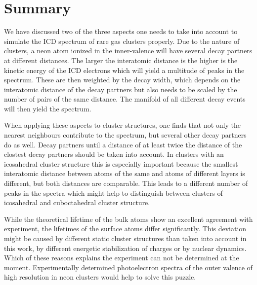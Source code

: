 \section{Summary}
\label{sec:summary}

We have discussed two of the three aspects one needs to take into account
to simulate the ICD spectrum of rare gas clusters properly. Due to the nature
of clusters, a neon atom ionized in the inner-valence will have several decay
partners at different distances. The larger the interatomic distance is the higher
is the kinetic energy of the ICD electrons which will yield a multitude of
peaks in the spectrum. These are then weighted by the decay width, which
depends on the interatomic distance of the decay partners but also needs
to be scaled by the number of pairs of the same distance.
The manifold of all different decay events will then yield the spectrum.

When applying these aspects to cluster structures, one finds that not only
the nearest neighbours contribute to the spectrum, but several other decay
partners do as well. Decay partners until a distance of at least twice the
distance of the clostest decay partners should be taken into account.
In clusters with an icosahedral cluster structure this is especially important
because the smallest interatomic distance between atoms of the same and atoms
of different layers is different, but both distances are comparable.
This leads to a different number of peaks in the spectra which might help to
distinguish between clusters of icosahedral and cuboctahedral cluster structure.

While the theoretical lifetime of the bulk atoms show an excellent agreement
with experiment, the lifetimes of the surface atoms differ significantly.
This deviation
might be caused by different static cluster structures than taken into account
in this work, by different energetic stabilization of charges or by nuclear
dynamics. Which of these reasons explains the experiment can not be determined
at the moment. Experimentally determined photoelectron spectra of the outer
valence of high resolution in neon clusters would help to solve this puzzle.
